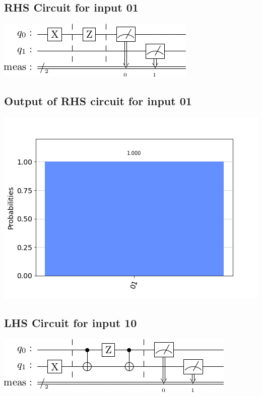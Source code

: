 \documentclass[a4paper]{article}
\begin{document}
\begin{answer}[Question 1 b (b)]
        \subsection*{RHS Circuit for input 01}
        \includegraphics[scale=0.5]{b201.png}
        \subsection*{Output of RHS circuit for input 01}
        \includegraphics[scale = 0.5]{b201-out.png}
        \subsection*{LHS Circuit for input 10}
        \includegraphics[scale=0.5]{b110.png}

\end{answer}
\end{document}

